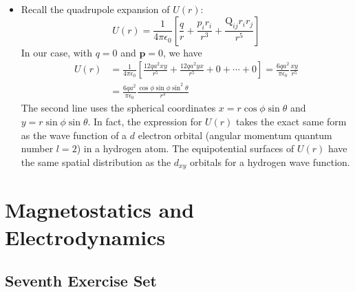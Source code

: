 \documentclass[11pt, a4paper]{article}
\renewcommand{\vec}[1]{\bm{#1}} %
\newcommand{\e}{\epsilon_{0}}  %
\begin{document}
\begin{itemize}
	\item Recall the quadrupole expansion of $ U(r) $:
	\begin{equation*}
		U(r) = \frac{1}{4\pi \e} \left[\frac{q}{r} + \frac{p_{i}r_{i}}{r^{3}} + \frac{\mathrm{Q}_{ij}r_{i}r_{j}}{r^{5}} \right]
	\end{equation*}
	In our case, with $ q = 0 $ and $ \vec{p} = 0 $, we have
	\begin{align*}
		U(r) &= \frac{1}{4\pi \e} \left[\frac{12qa^{2}xy}{r^{5}} + \frac{12qa^{2}yx}{r^{5}} + 0 + \cdots + 0\right] = \frac{6qa^{2}}{\pi \e} \frac{xy}{r^{5}}\\
		&=\frac{6qa^{2}}{\pi \e} \frac{\cos \phi \sin \phi \sin^{2}\theta}{r^{3}}
	\end{align*}
	The second line uses the spherical coordinates $ x = r\cos \phi \sin \theta $ and $ y = r\sin \phi \sin \theta $. In fact, the expression for $ U(r) $ takes the exact same form as the wave function of a $ d $ electron orbital (angular momentum quantum number $ l = 2 $) in a hydrogen atom. The equipotential surfaces of $ U(r) $ have the same spatial distribution as the $ d_{xy} $  orbitals for a hydrogen wave function. 
	
\end{itemize}

\newpage

\section{Magnetostatics and Electrodynamics}

\subsection{Seventh Exercise Set}
\end{document}
